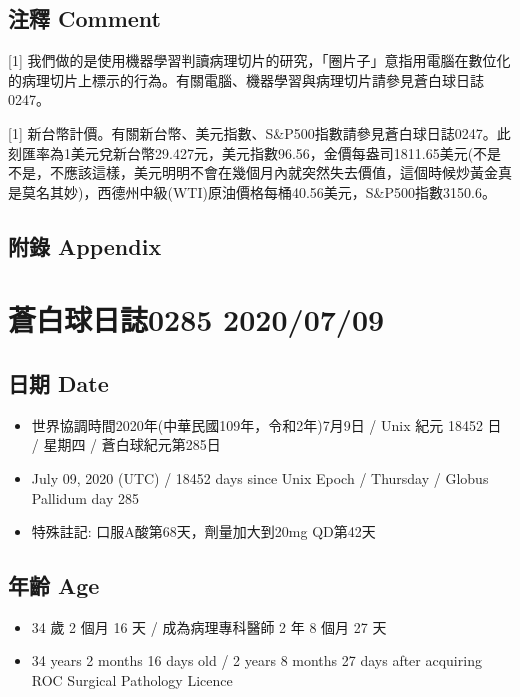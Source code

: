 \documentclass[a5paper, 11pt
]{book}
\providecommand{\tightlist}{%
  \setlength{\itemsep}{0pt}\setlength{\parskip}{0pt}}
\begin{document}
\hypertarget{ux6ce8ux91cb-comment-33}{%
\subsection{注釋 Comment}\label{ux6ce8ux91cb-comment-33}}

{[}1{]}
我們做的是使用機器學習判讀病理切片的研究，「圈片子」意指用電腦在數位化的病理切片上標示的行為。有關電腦、機器學習與病理切片請參見蒼白球日誌0247。

{[}1{]}
新台幣計價。有關新台幣、美元指數、S\&P500指數請參見蒼白球日誌0247。此刻匯率為1美元兌新台幣29.427元，美元指數96.56，金價每盎司1811.65美元(不是不是，不應該這樣，美元明明不會在幾個月內就突然失去價值，這個時候炒黃金真是莫名其妙)，西德州中級(WTI)原油價格每桶40.56美元，S\&P500指數3150.6。

\hypertarget{ux9644ux9304-appendix-33}{%
\subsection{附錄 Appendix}\label{ux9644ux9304-appendix-33}}

\hypertarget{ux84bcux767dux7403ux65e5ux8a8c0285-20200709}{%
\section{蒼白球日誌0285
2020/07/09}\label{ux84bcux767dux7403ux65e5ux8a8c0285-20200709}}

\hypertarget{ux65e5ux671f-date-34}{%
\subsection{日期 Date}\label{ux65e5ux671f-date-34}}

\begin{itemize}
\tightlist
\item
  世界協調時間2020年(中華民國109年，令和2年)7月9日 / Unix 紀元 18452 日
  / 星期四 / 蒼白球紀元第285日
\item
  July 09, 2020 (UTC) / 18452 days since Unix Epoch / Thursday / Globus
  Pallidum day 285
\item
  特殊註記: 口服A酸第68天，劑量加大到20mg QD第42天
\end{itemize}

\hypertarget{ux5e74ux9f61-age-34}{%
\subsection{年齡 Age}\label{ux5e74ux9f61-age-34}}

\begin{itemize}
\tightlist
\item
  34 歲 2 個月 16 天 / 成為病理專科醫師 2 年 8 個月 27 天
\item
  34 years 2 months 16 days old / 2 years 8 months 27 days after
  acquiring ROC Surgical Pathology Licence
\end{itemize}
\end{document}
